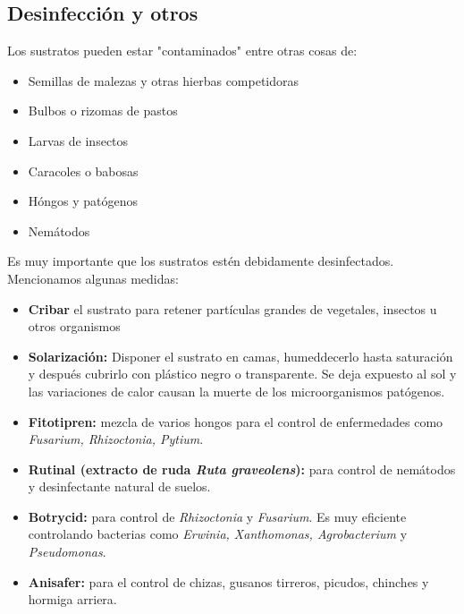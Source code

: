 \documentclass[a4paper,12pt,oneside]{article}
\begin{document}
\subsection{Desinfección y otros}
\label{sec:orgd6425ab}
Los sustratos pueden estar "contaminados" entre otras cosas de:
\begin{itemize}
\item Semillas de malezas y otras hierbas competidoras
\item Bulbos o rizomas de pastos
\item Larvas de insectos
\item Caracoles o babosas
\item Hóngos y patógenos
\item Nemátodos
\end{itemize}
Es muy importante que los sustratos estén debidamente desinfectados. Mencionamos
algunas medidas:
\begin{itemize}
\item \textbf{Cribar} el sustrato para retener partículas grandes de vegetales, insectos u
otros organismos
\item \textbf{Solarización:} Disponer el sustrato en camas, humeddecerlo hasta saturación y
después cubrirlo con plástico negro o transparente. Se deja expuesto al sol y
las variaciones de calor causan la muerte de los microorganismos patógenos.
\item \textbf{Fitotipren:} mezcla de varios hongos para el control de enfermedades como
\emph{Fusarium, Rhizoctonia, Pytium}.
\item \textbf{Rutinal (extracto de ruda \emph{Ruta graveolens}):} para control de nemátodos y
desinfectante natural de suelos.
\item \textbf{Botrycid:} para control de \emph{Rhizoctonia} y \emph{Fusarium}. Es muy eficiente
controlando bacterias como \emph{Erwinia, Xanthomonas, Agrobacterium} y \emph{Pseudomonas}.
\item \textbf{Anisafer:} para el control de chizas, gusanos tirreros, picudos, chinches y
hormiga arriera.
\end{itemize}
\end{document}
